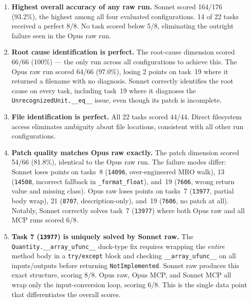 \begin{enumerate}

\item \textbf{Highest overall accuracy of any raw run.}
      Sonnet scored 164/176 (93.2\%), the highest among all four
      evaluated configurations.  14 of 22 tasks received a perfect 8/8.
      No task scored below 5/8, eliminating the outright failure seen
      in the Opus raw run.

\item \textbf{Root cause identification is perfect.}
      The root-cause dimension scored 66/66 (100\%) --- the only run
      across all configurations to achieve this.  The Opus raw run scored
      64/66 (97.0\%), losing 2 points on task~19 where it returned a
      filename with no diagnosis.  Sonnet correctly identifies the root
      cause on every task, including task~19 where it diagnoses the
      \texttt{UnrecognizedUnit.\_\_eq\_\_} issue, even though its patch
      is incomplete.

\item \textbf{File identification is perfect.}
      All 22 tasks scored 44/44.  Direct filesystem access eliminates
      ambiguity about file locations, consistent with all other run
      configurations.

\item \textbf{Patch quality matches Opus raw exactly.}
      The patch dimension scored 54/66 (81.8\%), identical to the Opus
      raw run.  The failure modes differ: Sonnet loses points on
      tasks~8 (\texttt{14096}, over-engineered MRO walk), 13
      (\texttt{14508}, incorrect fallback in \texttt{\_format\_float}),
      and~19 (\texttt{7606}, wrong return value and missing class).
      Opus raw loses points on tasks~7 (\texttt{13977}, partial body
      wrap), 21 (\texttt{8707}, description-only), and~19 (\texttt{7606},
      no patch at all).
      Notably, Sonnet correctly solves task~7 (\texttt{13977}) where
      both Opus raw and all MCP runs scored 6/8.

\item \textbf{Task 7 (\texttt{13977}) is uniquely solved by Sonnet raw.}
      The \texttt{Quantity.\_\_array\_ufunc\_\_} duck-type fix requires
      wrapping the \emph{entire} method body in a \texttt{try/except}
      block and checking \texttt{\_\_array\_ufunc\_\_} on all
      inputs/outputs before returning \texttt{NotImplemented}.  Sonnet
      raw produces this exact structure, scoring 8/8.  Opus raw, Opus
      MCP, and Sonnet MCP all wrap only the input-conversion loop,
      scoring 6/8.  This is the single data point that differentiates
      the overall scores.


\end{enumerate}
